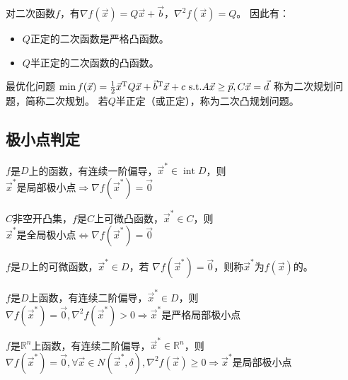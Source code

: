 对二次函数$f$，有$\nabla f(\vec{x})=Q\vec{x}+\vec{b}$，$\nabla^2 f(\vec{x}) = Q$。
因此有：
\begin{itemize}
    \item $Q$正定的二次函数是严格凸函数。
    \item $Q$半正定的二次函数的凸函数。
\end{itemize}

\begin{definition}[二次规划]
    最优化问题
    $\min f(\vec{x})=\frac{1}{2}\vec{x}\Transpose Q\vec{x} + \vec{b}\Transpose\vec{x} + c ~\linebreak[1] \SubjectTo A\vec{x}\geq \vec{p}, C\vec{x} = \vec{d}$
    称为二次规划问题，简称二次规划。
    若$Q$半正定（或正定），称为二次凸规划问题。
\end{definition}

\subsection{极小点判定}

\begin{theorem}
    $f$是$D$上的函数，有连续一阶偏导，$\vec{x}^*\in \operatorname{int}D$，则
    $\vec{x}^*\text{是局部极小点} \Rightarrow \nabla f(\vec{x}^*)=\vec{0}$
\end{theorem}

\begin{theorem}
    $C$非空开凸集，$f$是$C$上可微凸函数，$\vec{x}^*\in C$，则
    $\vec{x}^*\text{是全局极小点} \Leftrightarrow \nabla f(\vec{x}^*)=\vec{0}$
\end{theorem}

\begin{definition}[驻点]
    $f$是$D$上的可微函数，$\vec{x}^*\in D$，若
    $\nabla f(\vec{x}^*)=\vec{0}$，则称$\vec{x}^*$为$f(\vec{x})$的。
\end{definition}

\begin{theorem}
    $f$是$D$上函数，有连续二阶偏导，$\vec{x}^*\in D$，则
    $\nabla f(\vec{x}^*)=\vec{0}, \nabla^2 f(\vec{x}^*)>0 \Rightarrow\vec{x}^*\text{是严格局部极小点}$
\end{theorem}

\begin{theorem}
    $f$是$\mathbb{R}^n$上函数，有连续二阶偏导，$\vec{x}^*\in \mathbb{R}^n$，则
    $\nabla f(\vec{x}^*)=\vec{0}, \forall \vec{x}\in N(\vec{x}^*,\delta), \nabla^2 f(\vec{x})\geq 0 \Rightarrow\vec{x}^*\text{是局部极小点}$
\end{theorem}

